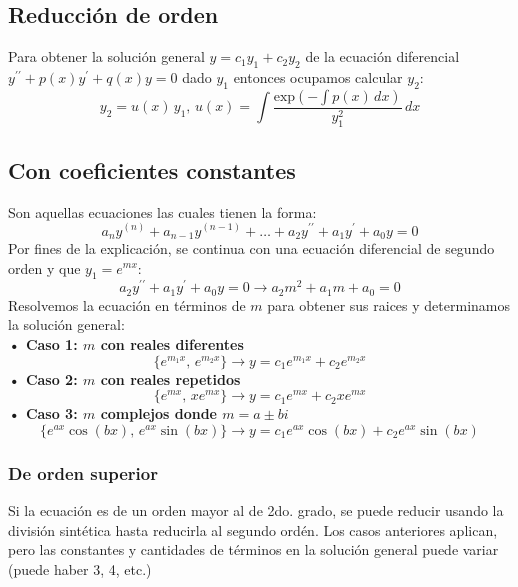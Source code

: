 \documentclass[letterpaper, 12pt]{article}
\begin{document}
\begin{justify}
        \subsection{Reducción de orden}
        \justify
        Para obtener la solución general \(y=c_1y_1+c_2y_2\) de la ecuación diferencial \(y^{\prime\prime}+p(x)y^{\prime}+q(x)y=0\) dado \(y_1\) entonces ocupamos calcular \(y_2\):
        {\large\[y_2=u(x)\, y_1,\, u(x)=\int \frac{\text{exp}\left(-\int p(x)\, dx\right)}{y^2_1}\, dx\]}
        \subsection{Con coeficientes constantes}
        \justify
        Son aquellas ecuaciones las cuales tienen la forma:
        {\large\[a_ny^{(n)}+a_{n-1}y^{(n-1)}+\dots+a_2y^{\prime\prime}+a_1y^{\prime}+a_0y=0\]}
        \justify
        Por fines de la explicación, se continua con una ecuación diferencial de segundo orden y que \(y_1=e^{mx}\):
        {\large\[a_2y^{\prime\prime}+a_1y^{\prime}+a_0y=0\rightarrow a_2m^2+a_1m+a_0=0\]}
        \justify
        Resolvemos la ecuación en términos de \(m\) para obtener sus raices y determinamos la solución general:
        \newline\\
        {\large\textbf{• Caso 1: \(m\) con reales diferentes}\[\{e^{m_1x},\, e^{m_2x}\}\rightarrow y=c_1e^{m_1x}+c_2e^{m_2x}\]}
        {\large\textbf{• Caso 2: \(m\) con reales repetidos}\[\{e^{mx},\, xe^{mx}\}\rightarrow y=c_1e^{mx}+c_2xe^{mx}\]}
        {\large\textbf{• Caso 3: \(m\) complejos donde \(m=a\pm bi\)}\[\{e^{ax}\cos(bx),\, e^{ax}\sin(bx)\}\rightarrow y=c_1e^{ax}\cos(bx)+c_2e^{ax}\sin(bx)\]}
        \subsubsection{De orden superior}
        \justify
        Si la ecuación es de un orden mayor al de 2do. grado, se puede reducir usando la división sintética hasta reducirla al segundo ordén.
        Los casos anteriores aplican, pero las constantes y cantidades de términos en la solución general puede variar (puede haber 3, 4, etc.)

\end{justify}
\end{document}
